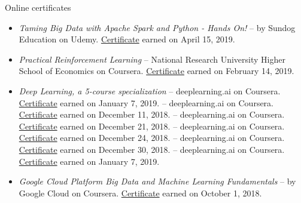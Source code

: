 
\begin{rSection}{Online certificates}
  \begin{itemize}
    \item{\it Taming Big Data with Apache Spark and Python - Hands On!} -- by Sundog Education on Udemy. \href{https://www.udemy.com/certificate/UC-G53DWS5V/}{Certificate} earned on April 15, 2019.
    \item {\it Practical Reinforcement Learning} -- National Research University Higher School of Economics on Coursera. \href{https://coursera.org/share/7dbaef1de4f13d7016316a4dd7eece8a}{Certificate} earned on February 14, 2019.
    \item{\it Deep Learning, a 5-course specialization} -- deeplearning.ai on Coursera. \href{https://coursera.org/share/47b1d9ff10e34c9d26c75f5f0914379b}{Certificate} earned on January 7, 2019.
     -- deeplearning.ai on Coursera. \href{https://coursera.org/share/b99cfdbf684af876690916f62a41f74d}{Certificate} earned on December 11, 2018.
     -- deeplearning.ai on Coursera. \href{https://coursera.org/share/70436cea6ad8695c56da96f285739488}{Certificate} earned on December 21, 2018.
     -- deeplearning.ai on Coursera. \href{https://coursera.org/share/b4fec0b5c8ada28277e0369aced10c34}{Certificate} earned on December 24, 2018.
     -- deeplearning.ai on Coursera. \href{https://coursera.org/share/efaf45dddda63778f97da9aafaaa71b0}{Certificate} earned on December 30, 2018.
     -- deeplearning.ai on Coursera. \href{https://coursera.org/share/aeb503aafcd63fd9b1e098c232c6cfa4}{Certificate} earned on January 7, 2019.
    \item {\it Google Cloud Platform Big Data and Machine Learning Fundamentals} -- by Google Cloud on Coursera. \href{https://coursera.org/share/469ce1832e0392458bc6930beb44d8c6}{Certificate} earned on October 1, 2018.
  \end{itemize}
\end{rSection}

